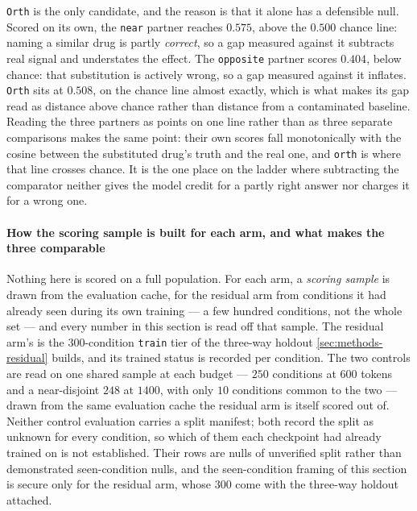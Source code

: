 \texttt{Orth} is the only candidate, and the reason is that it alone has a
defensible null. Scored on its own, the \texttt{near} partner reaches $0.575$,
above the $0.500$ chance line: naming a similar drug is partly \emph{correct},
so a gap measured against it subtracts real signal and understates the effect.
The \texttt{opposite} partner scores $0.404$, below chance: that substitution is
actively wrong, so a gap measured against it inflates. \texttt{Orth} sits at
$0.508$, on the chance line almost exactly, which is what makes its gap read as
distance above chance rather than distance from a contaminated baseline. Reading
the three partners as points on one line rather than as three separate
comparisons makes the same point: their own scores fall monotonically with the
cosine between the substituted drug's truth and the real one, and \texttt{orth}
is where that line crosses chance. It is the one place on the ladder where
subtracting the comparator neither gives the model credit for a partly right
answer nor charges it for a wrong one.


\paragraph{How the scoring sample is built for each arm, and what makes the
three comparable} 
Nothing here is scored on a full population. For each arm, a
\emph{scoring sample} is drawn from the evaluation cache, for the residual arm
from conditions it had already seen during its own training --- a few hundred conditions, not the whole set --- and every
number in this section is read off that sample. The residual arm's is the
$\num{300}$-condition \texttt{train} tier of the three-way holdout
\cref{sec:methods-residual} builds, and its trained status is recorded per
condition. The two controls are read on one shared sample at each budget --- $\num{250}$
conditions at $600$ tokens and a near-disjoint $\num{248}$ at $1400$, with only
$\num{10}$ conditions common to the two --- drawn from the same evaluation cache
the residual arm is itself scored out of. Neither control evaluation carries a
split manifest; both record the split as unknown for every condition, so which of
them each checkpoint had already trained on is not established. Their rows are
nulls of unverified split rather than demonstrated seen-condition nulls, and the
seen-condition framing of this section is secure only for the residual arm, whose
$\num{300}$ come with the three-way holdout attached.

